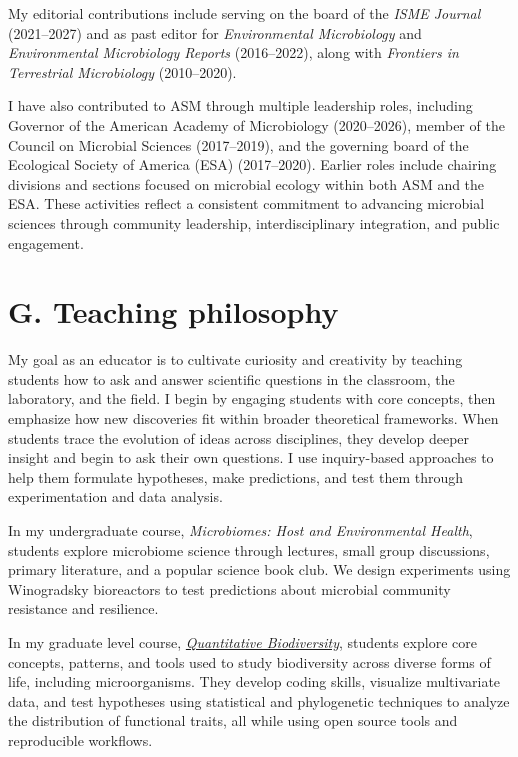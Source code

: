 \documentclass[11pt]{article}  %
\begin{document}
My editorial contributions include serving on the board of the \textit{ISME Journal} (2021–2027) and as past editor for \textit{Environmental Microbiology }and \textit{Environmental Microbiology Reports} (2016–2022), along with \textit{Frontiers in Terrestrial Microbiology} (2010–2020).

I have also contributed to ASM through multiple leadership roles, including Governor of the American Academy of Microbiology (2020–2026), member of the Council on Microbial Sciences (2017–2019), and the governing board of the Ecological Society of America (ESA) (2017–2020). Earlier roles include chairing divisions and sections focused on microbial ecology within both ASM and the ESA. These activities reflect a consistent commitment to advancing microbial sciences through community leadership, interdisciplinary integration, and public engagement.

\section*{G. Teaching philosophy}
\vspace{-0.5em}
My goal as an educator is to cultivate curiosity and creativity by teaching students how to ask and answer scientific questions in the classroom, the laboratory, and the field. I begin by engaging students with core concepts, then emphasize how new discoveries fit within broader theoretical frameworks. When students trace the evolution of ideas across disciplines, they develop deeper insight and begin to ask their own questions. I use inquiry-based approaches to help them formulate hypotheses, make predictions, and test them through experimentation and data analysis.

In my undergraduate course, \textit{Microbiomes: Host and Environmental Health}, students explore microbiome science through lectures, small group discussions, primary literature, and a popular science book club. We design experiments using Winogradsky bioreactors to test predictions about microbial community resistance and resilience.

In my graduate level course, \href{https://qbiodiversity.netlify.app/}{\textit{Quantitative Biodiversity}}, students explore core concepts, patterns, and tools used to study biodiversity across diverse forms of life, including microorganisms. They develop coding skills, visualize multivariate data, and test hypotheses using statistical and phylogenetic techniques to analyze the distribution of functional traits, all while using open source tools and reproducible workflows.
\end{document}
